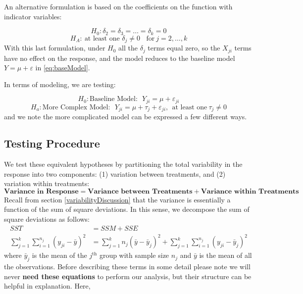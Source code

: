 \documentclass[
]{book}
\begin{document}
An alternative formulation is based on the coefficients on the function with indicator variables:

\[H_0: \delta_2 = \delta_3 = \ldots = \delta_k = 0\]
\[H_A: ~\text{at least one } \delta_j \neq 0~~~~\text{for}~j=2,\ldots,k\]
With this last formulation, under \(H_0\) all the \(\delta_j\) terms equal zero, so the \(X_{ji}\) terms have no effect on the response, and the model reduces to the baseline model \(Y = \mu+\varepsilon\) in \eqref{eq:baseModel}.

In terms of modeling, we are testing:

\[H_0: \textrm{Baseline Model:} ~~~ Y_{ji} = \mu + \varepsilon_{ji}\]
\[H_a: \textrm{More Complex Model:} ~~~ Y_{ji} = \mu + \tau_j + \varepsilon_{ji},~~\textrm{at least one}~\tau_j\neq0\]
and we note the more complicated model can be expressed a few different ways.

\hypertarget{testing-procedure}{%
\subsection{Testing Procedure}\label{testing-procedure}}

We test these equivalent hypotheses by partitioning the total variability in the response into two components: (1) variation between treatments, and (2) variation within treatments:
\[\textbf{Variance in Response} = \textbf{Variance between Treatments} + \textbf{Variance within Treatments}\]
Recall from section \ref{variabilityDiscussion} that the variance is essentially a function of the sum of square deviations.
In this sense, we decompose the sum of square deviations as follows:
\begin{equation}
\begin{split}
SST &= SSM + SSE \\
\displaystyle\sum_{j=1}^k\sum_{i=1}^{n_j} \left(y_{ji} - \bar{y}\right)^2 &= \displaystyle\sum_{j=1}^kn_j\left(\bar{y} - \bar{y}_j\right)^2 + \sum_{j=1}^k\sum_{i=1}^{n_j}\left(y_{ji} - \bar{y}_j\right)^2
\end{split}
\label{eq:anovaDecomp}
\end{equation}
where \(\bar{y}_j\) is the mean of the \(j^\mathrm{th}\) group with sample size \(n_j\) and \(\bar{y}\) is the mean of all the observations.
Before describing these terms in some detail please note we will never \textbf{need these equations} to perform our analysis, but their structure can be helpful in explanation. Here,
\end{document}
